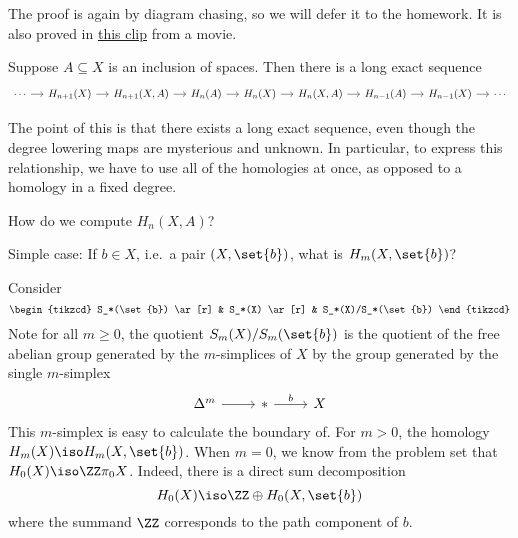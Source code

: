 \documentclass{standalone}
\begin{document}
The proof is again by diagram chasing, so we will defer it to the homework.
It is also proved in
\href{https://www.youtube.com/watch?v=etbcKWEKnvg}{this clip} from a movie.

\begin{corollary}
  Suppose \(A \subseteq X\) is an inclusion of spaces.
  Then there is a long exact sequence
  \[
    \begin{tikzcd}[column sep=small]
      \cdots \ar[r] &
      H_{n+1}(X) \ar[r] &
      H_{n+1}(X, A) \ar[r] &
      H_n(A) \ar[r] &
      H_n(X) \ar[r] &
      H_n(X, A) \ar[r] &
      H_{n-1}(A) \ar[r] &
      H_{n-1}(X) \ar[r] &
      \cdots
    \end{tikzcd}
  \]
\end{corollary}
The point of this is that there exists a long exact sequence, even though
the degree lowering maps are mysterious and unknown. In particular,
to express this relationship, we have to use all of the homologies at once, as opposed to a
homology in a fixed degree.

\begin{question}
   How do we compute \(H_n(X, A)\)?
\end{question}

Simple case: If \(b \in X\), i.e.\ a pair \((X, \set{b})\),
what is \(H_m(X, \set{b})\)?

Consider
\[
  \begin{tikzcd}
    S_*(\set{b}) \ar[r] &
    S_*(X) \ar[r] &
    S_*(X)/S_*(\set{b})
  \end{tikzcd}
\]
Note for all \(m \geq 0\), the quotient \(S_m(X) / S_m(\set{b})\) is
the quotient of the free abelian group generated by the \(m\)-simplices
of \(X\) by the group generated by the single \(m\)-simplex
\[
  \begin{tikzcd}
    \Delta^m \ar[r] &
    * \ar[r, "b"] &
    X
  \end{tikzcd}
\]
This \(m\)-simplex is easy to calculate the boundary of.
For \(m > 0\), the homology \(H_m(X) \iso H_m(X, \set{b})\).
When \(m = 0\), we know from the problem set that \(H_0(X) \iso \ZZ \pi_0 X\).
Indeed, there is a direct sum decomposition
\[
  H_0(X) \iso \ZZ \oplus H_0(X, \set{b})
\]
where the summand \(\ZZ\) corresponds to the path component of \(b\).
\end{document}
